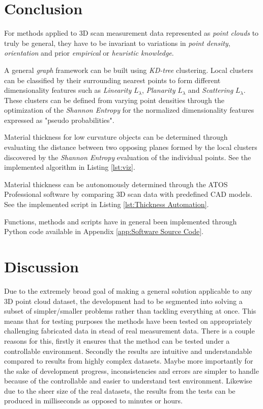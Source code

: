 \documentclass[%
]{USN-MSc}
\begin{document}
\chapter{Conclusion}
\label{ch:conclusion}
For methods applied to 3D scan measurement data represented as \textit{point clouds} to truly be general, they have to be invariant to variations in \textit{point density}, \textit{orientation} and prior \textit{empirical} or \textit{heuristic knowledge}.

A general \textit{graph} framework can be built using \textit{KD-tree} clustering. Local clusters can be classified by their surrounding nearest points to form different dimensionality features such as \textit{Linearity} \(L_\lambda\), \textit{Planarity} \(L_\lambda\) and \textit{Scattering} \(L_\lambda\). These clusters can be defined from varying point densities through the optimization of the \textit{Shannon Entropy} for the normalized dimensionality features expressed as "pseudo probabilities".

Material thickness for low curvature objects can be determined through evaluating the distance between two opposing planes formed by the local clusters discovered by the \textit{Shannon Entropy} evaluation of the individual points. See the implemented algorithm in Listing \ref{lst:viz}.

Material thickness can be autonomously determined through the ATOS Professional software by comparing 3D scan data with predefined CAD models. See the implemented script in Listing \ref{lst:Thickness Automation}.

Functions, methods and scripts have in general been implemented through Python code available in Appendix \ref{app:Software Source Code}.

\chapter{Discussion}
\label{ch:discussion}
Due to the extremely broad goal of making a general solution applicable to any 3D point cloud dataset, the development had to be segmented into solving a subset of simpler/smaller problems rather than tackling everything at once. This means that for testing purposes the methods have been tested on appropriately challenging fabricated data in stead of real measurement data. There is a couple reasons for this, firstly it ensures that the method can be tested under a controllable environment. Secondly the results are intuitive and understandable compared to results from highly complex datasets. Maybe more importantly for the sake of development progress, inconsistencies and errors are simpler to handle because of the controllable and easier to understand test environment. Likewise due to the sheer size of the real datasets, the results from the tests can be produced in milliseconds as opposed to minutes or hours.
\end{document}
